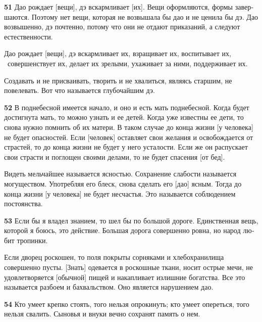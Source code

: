 \documentclass[a4paper]{article}
\begin{document}
{\ttfamily
\foreignlanguage{russian}{\textrm{\textbf{51}}}\foreignlanguage{russian}{\textrm{ Дао рождает [вещи], дэ вскармливает
[их]. Вещи оформляются, формы завершаются. Поэтому нет вещи, которая не возвышала бы дао и не ценила бы дэ. Дао
возвышенно, дэ почтенно, потому что они не отдают приказаний, а следуют естественности.}}}

{
Дао рождает [вещи], дэ вскармливает их, взращивает их, воспитывает их, \ совершенствует их, делает их зрелыми, ухаживает
за ними, поддерживает их.}

{
Создавать и не присваивать, творить и не хвалиться, являясь старшим, не повелевать. Вот что называется глубочайшим дэ.}

{\ttfamily
\foreignlanguage{russian}{\textrm{\textbf{52}}}\foreignlanguage{russian}{\textrm{ В поднебесной имеется начало, и оно и
есть мать поднебесной. Когда будет достигнута мать, то можно узнать и ее детей. Когда уже известны ее дети, то снова
нужно помнить об их матери. В таком случае до конца жизни [у человека] не будет опасностей. Если [человек] оставляет
свои желания и освобождается от страстей, то до конца жизни не будет у него усталости. Если же он распускает свои
страсти и поглощен своими делами, то не будет спасения [от бед].}}}

{
Видеть мельчайшее называется ясностью. Сохранение слабости называется могуществом. Употребляя его блеск, снова сделать
его [дао] ясным. Тогда до конца жизни [у человека] не будет несчастья. Это называется соблюдением постоянства.}


\bigskip

{\ttfamily
\foreignlanguage{russian}{\textrm{\textbf{53}}}\foreignlanguage{russian}{\textrm{ Если бы я владел знанием, то шел бы по
большой дороге. Единственная вещь, которой я боюсь, это действие. Большая дорога совершенно ровна, но народ любит
тропинки.}}}

{
Если дворец роскошен, то поля покрыты сорняками и хлебохранилища совершенно пусты. [Знать] одевается в роскошные ткани,
носит острые мечи, не удовлетворяется [обычной] пищей и накапливает излишние богатства. Все это называется разбоем и
бахвальством. Оно является нарушением дао.}

{\ttfamily
\foreignlanguage{russian}{\textrm{\textbf{54}}}\foreignlanguage{russian}{\textrm{ Кто умеет крепко стоять, того нельзя
опрокинуть; кто умеет опереться, того нельзя свалить. Сыновья и внуки вечно сохранят память о нем.}}}
\end{document}
